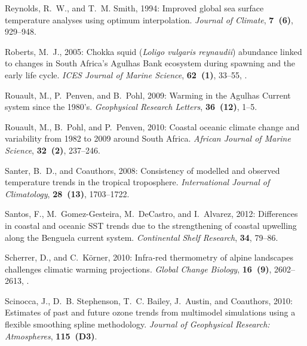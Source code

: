 \documentclass[]{ametsoc}
\begin{document}
\begin{thebibliography}{41}
Reynolds, R.~W., and T.~M. Smith, 1994: {Improved global sea surface
  temperature analyses using optimum interpolation}. \textit{Journal of
  Climate}, \textbf{7~(6)}, 929--948.

Roberts, M.~J., 2005: {Chokka squid (\textit{Loligo vulgaris reynaudii}) abundance
  linked to changes in South Africa's Agulhas Bank ecosystem during spawning
  and the early life cycle}. \textit{ICES Journal of Marine Science},
  \textbf{62~(1)}, 33--55, .

Rouault, M., P.~Penven, and B.~Pohl, 2009: {Warming in the Agulhas Current
  system since the 1980's}. \textit{Geophysical Research Letters},
  \textbf{36~(12)}, 1--5.

Rouault, M., B.~Pohl, and P.~Penven, 2010: {Coastal oceanic climate change and
  variability from 1982 to 2009 around South Africa}. \textit{African Journal
  of Marine Science}, \textbf{32~(2)}, 237--246.

Santer, B.~D., and Coauthors, 2008: Consistency of modelled and observed
  temperature trends in the tropical troposphere. \textit{International Journal
  of Climatology}, \textbf{28~(13)}, 1703--1722.

Santos, F., M.~Gomez-Gesteira, M.~DeCastro, and I.~Alvarez, 2012: {Differences
  in coastal and oceanic SST trends due to the strengthening of coastal
  upwelling along the Benguela current system}. \textit{Continental Shelf
  Research}, \textbf{34}, 79--86.

Scherrer, D., and C.~K{\"{o}}rner, 2010: {Infra-red thermometry of alpine
  landscapes challenges climatic warming projections}. \textit{Global Change
  Biology}, \textbf{16~(9)}, 2602--2613,
  .

Scinocca, J., D.~B. Stephenson, T.~C. Bailey, J.~Austin, and Coauthors, 2010:
  Estimates of past and future ozone trends from multimodel simulations using a
  flexible smoothing spline methodology. \textit{Journal of Geophysical
  Research: Atmospheres}, \textbf{115~(D3)}.


\end{thebibliography}
\end{document}
